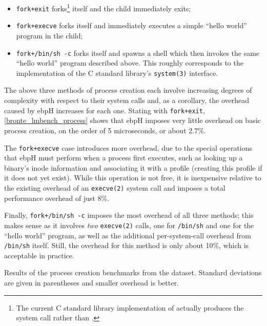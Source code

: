 \documentclass[
  12pt]{findlay}
\newcommand{\passthrough}[1]{#1}
\providecommand{\tightlist}{\setlength{\itemsep}{0pt}\setlength{\parskip}{0pt}}
\begin{document}
\begin{itemize}
\tightlist
\item
  \passthrough{\lstinline!fork+exit!}
  forks\footnote{The current C standard library implementation of 
  actually produces the  system call rather than .}
  itself and the child immediately exits;
\item
  \passthrough{\lstinline!fork+execve!} forks itself and immediately
  executes a simple ``hello world'' program in the child;
\item
  \passthrough{\lstinline!fork+/bin/sh -c!} forks itself and spawns a
  shell which then invokes the same ``hello world'' program described
  above. This roughly corresponds to the implementation of the C
  standard library's \passthrough{\lstinline!system(3)!}
  \autocite{man_system} interface.
\end{itemize}

The above three methods of process creation each involve increasing
degrees of complexity with respect to their system calls and, as a
corollary, the overhead caused by ebpH increases for each one. Stating
with \passthrough{\lstinline!fork+exit!},
\autoref{bronte_lmbench_process} shows that ebpH imposes very little
overhead on basic process creation, on the order of 5 microseconds, or
about 2.7\%.

The \passthrough{\lstinline!fork+execve!} case introduces more overhead,
due to the special operations that ebpH must perform when a process
first executes, such as looking up a binary's inode information and
associating it with a profile (creating this profile if it does not yet
exist). While this operation is not free, it is inexpensive relative to
the existing overhead of an \passthrough{\lstinline!execve(2)!} system
call and imposes a total performance overhead of just 8\%.

Finally, \passthrough{\lstinline!fork+/bin/sh -c!} imposes the most
overhead of all three methods; this makes sense as it involves
\emph{two} \passthrough{\lstinline!execve(2)!} calls, one for
\passthrough{\lstinline!/bin/sh!} and one for the ``hello world''
program, as well as the additional per-system-call overhead from
\passthrough{\lstinline!/bin/sh!} itself. Still, the overhead for this
method is only about 10\%, which is acceptable in practice.

\begin{table}
    \caption[Results of the process creation benchmarks from the  dataset]{
        Results of the process creation benchmarks from the  dataset.
        Standard deviations are given in parentheses and smaller overhead is better.
    }
    \label{bronte_lmbench_process}
    
\end{table}
\end{document}
